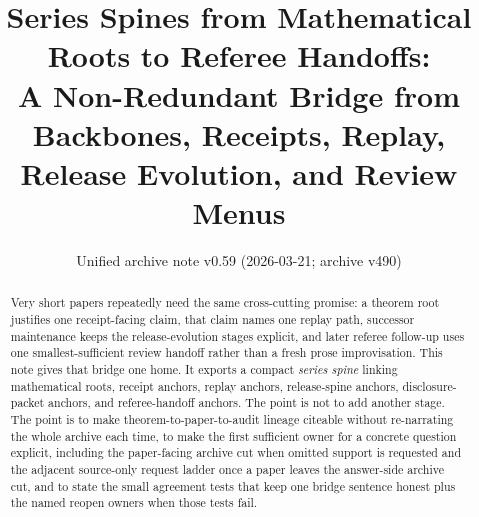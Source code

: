 \documentclass[11pt]{article}
\title{Series Spines from Mathematical Roots to Referee Handoffs:\\[0.5ex]
\large A Non-Redundant Bridge from Backbones, Receipts, Replay, Release Evolution, and Review Menus}
\author{}
\date{Unified archive note v0.59 (2026-03-21; archive v490)}
\begin{document}
\maketitle

\begin{abstract}
Very short papers repeatedly need the same cross-cutting promise: a theorem root justifies one receipt-facing claim, that claim names one replay path, successor maintenance keeps the release-evolution stages explicit, and later referee follow-up uses one smallest-sufficient review handoff rather than a fresh prose improvisation.
This note gives that bridge one home.
It exports a compact \emph{series spine} linking mathematical roots, receipt anchors, replay anchors, release-spine anchors, disclosure-packet anchors, and referee-handoff anchors.
The point is not to add another stage.
The point is to make theorem-to-paper-to-audit lineage citeable without re-narrating the whole archive each time, to make the first sufficient owner for a concrete question explicit, including the paper-facing archive cut when omitted support is requested and the adjacent source-only request ladder once a paper leaves the answer-side archive cut, and to state the small agreement tests that keep one bridge sentence honest plus the named reopen owners when those tests fail.
\end{abstract}
\end{document}

